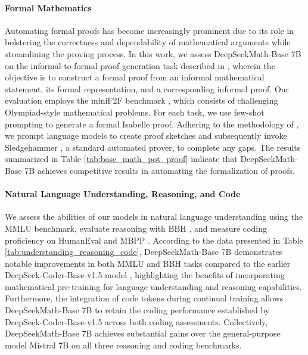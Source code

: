 \begin{itemize}[topsep=0pt]
\paragraph{Formal Mathematics}

Automating formal proofs has become increasingly prominent due to its role in bolstering the correctness and dependability of mathematical arguments while streamlining the proving process. In this work, we assess DeepSeekMath-Base 7B on the informal-to-formal proof generation task described in \citep{dsp_proof}, wherein the objective is to construct a formal proof from an informal mathematical statement, its formal representation, and a corresponding informal proof. Our evaluation employs the miniF2F benchmark \citep{minif2f}, which consists of challenging Olympiad-style mathematical problems. For each task, we use few-shot prompting to generate a formal Isabelle proof. Adhering to the methodology of \cite{dsp_proof}, we prompt language models to create proof sketches and subsequently invoke Sledgehammer \citep{sledgehammer}, a standard automated prover, to complete any gaps. The results summarized in Table \ref{tab:base_math_pot_proof} indicate that DeepSeekMath-Base 7B achieves competitive results in automating the formalization of proofs.

\paragraph{Natural Language Understanding, Reasoning, and Code}

We assess the abilities of our models in natural language understanding using the MMLU \citep{mmlu} benchmark, evaluate reasoning with BBH \citep{bbh}, and measure coding proficiency on HumanEval \citep{codex} and MBPP \citep{mbpp}. According to the data presented in Table \ref{tab:understanding_reasoning_code}, DeepSeekMath-Base 7B demonstrates notable improvements in both MMLU and BBH tasks compared to the earlier DeepSeek-Coder-Base-v1.5 model \citep{deepseek-coder}, highlighting the benefits of incorporating mathematical pre-training for language understanding and reasoning capabilities. Furthermore, the integration of code tokens during continual training allows DeepSeekMath-Base 7B to retain the coding performance established by DeepSeek-Coder-Base-v1.5 across both coding assessments. Collectively, DeepSeekMath-Base 7B achieves substantial gains over the general-purpose model Mistral 7B \citep{mistral} on all three reasoning and coding benchmarks.


\end{itemize}
